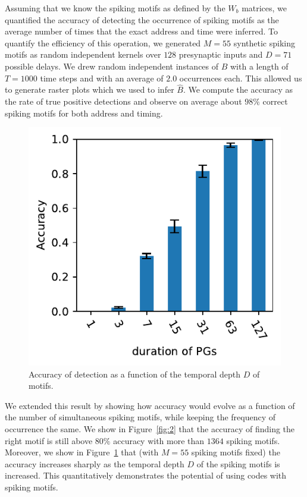 \documentclass[11pt]{article}
\begin{document}
Assuming that we know the spiking motifs as defined by the $W_b$ matrices, we quantified the accuracy of detecting the occurrence of spiking motifs as the average number of times that the exact address and time were inferred.  
To quantify the efficiency of this operation, we generated $M=55$ synthetic spiking motifs as random independent kernels over $128$ presynaptic inputs and $D=71$ possible delays. We drew random independent instances of $B$ with a length of $T=1000$ time steps and with an average of $2.0$ occurrences each. This allowed us to generate raster plots which we used to infer $\hat{B}$. We compute the accuracy as the rate of true positive detections and observe on average about $98\%$ correct spiking motifs for both address and timing.

\begin{figure}
\vspace{-10pt}
\includegraphics[width=\linewidth]{figure_N_PG_time.pdf}
\vspace{-25pt}
{
\caption{Accuracy of detection as a function of the temporal depth $D$ of motifs.
}
\label{fig:3}
}
\end{figure}
We extended this result by showing how accuracy would evolve as a function of the number of simultaneous spiking motifs, while keeping the frequency of occurrence the same. We show in Figure~\ref{fig:2} that the accuracy of finding the right motif is still above $80\%$ accuracy with more than $1364$ spiking motifs. Moreover, we show in Figure~\ref{fig:3} that (with $M=55$ spiking motifs fixed) the accuracy increases sharply as the temporal depth $D$ of the spiking motifs is increased. This quantitatively demonstrates the potential of using codes with spiking motifs. 
\end{document}

